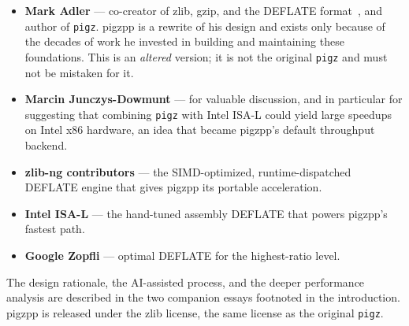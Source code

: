\documentclass{pigzpp-whitepaper}
\begin{document}
\begin{itemize}
  \item \textbf{Mark Adler} --- co-creator of zlib, gzip, and the DEFLATE
  format~\citep{rfc1950,rfc1952,rfc1951}, and author of \texttt{pigz}. pigzpp is a
  rewrite of
  his design and exists only because of the decades of work he invested in
  building and maintaining these foundations. This is an \emph{altered} version;
  it is not the original \texttt{pigz} and must not be mistaken for it.

  \item \textbf{Marcin Junczys-Dowmunt} --- for valuable discussion,
  and in particular for suggesting that combining \texttt{pigz} with Intel ISA-L
  could yield large speedups on Intel x86 hardware, an idea that became pigzpp's
  default throughput backend.

  \item \textbf{zlib-ng contributors} --- the SIMD-optimized,
  runtime-dispatched DEFLATE engine that gives pigzpp its portable acceleration.
  \item \textbf{Intel ISA-L} --- the hand-tuned assembly DEFLATE that
  powers pigzpp's fastest path.
  \item \textbf{Google Zopfli} --- optimal DEFLATE for the
  highest-ratio level.

\end{itemize}

\noindent The design rationale, the AI-assisted process, and the deeper
performance analysis are described in the two companion essays footnoted in the
introduction. pigzpp is released under the zlib license, the same license as the
original \texttt{pigz}.



\end{document}
